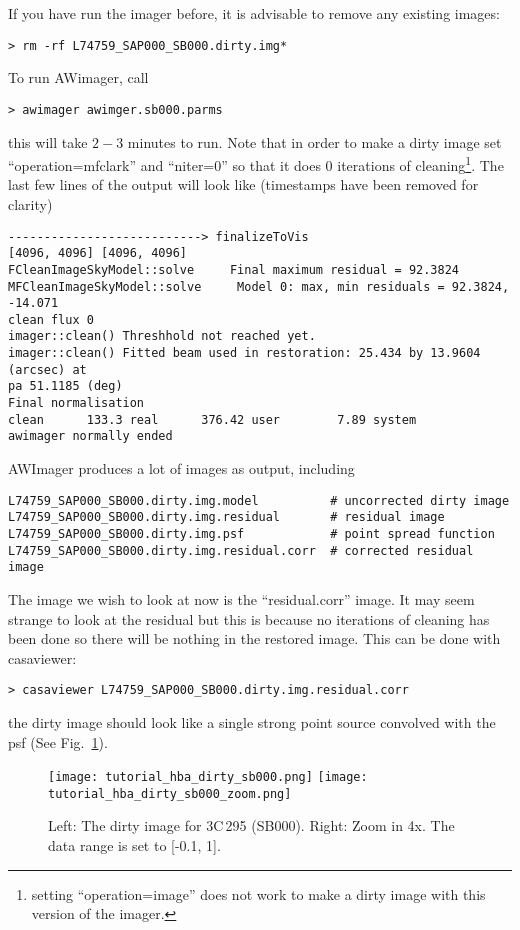 If you have run the imager before, it is advisable to remove any existing images:
\begin{verbatim}
> rm -rf L74759_SAP000_SB000.dirty.img*
\end{verbatim}
To run AWimager, call
\begin{verbatim}
> awimager awimger.sb000.parms
\end{verbatim}
this will take $2-3$ minutes to run. Note that in order to make a dirty image set ``operation=mfclark'' and ``niter=0'' so that it does 0 iterations of cleaning\footnote{setting ``operation=image'' does not work to make a dirty image with this version of the imager.}. The last few lines of the output will look like (timestamps have been removed for clarity)
\begin{lstlisting}
---------------------------> finalizeToVis
[4096, 4096] [4096, 4096]
FCleanImageSkyModel::solve     Final maximum residual = 92.3824
MFCleanImageSkyModel::solve     Model 0: max, min residuals = 92.3824, -14.071 
clean flux 0
imager::clean() Threshhold not reached yet.
imager::clean() Fitted beam used in restoration: 25.434 by 13.9604 (arcsec) at 
pa 51.1185 (deg) 
Final normalisation
clean      133.3 real      376.42 user        7.89 system
awimager normally ended
\end{lstlisting}
AWImager produces a lot of images as output, including
\begin{verbatim}
L74759_SAP000_SB000.dirty.img.model          # uncorrected dirty image
L74759_SAP000_SB000.dirty.img.residual       # residual image
L74759_SAP000_SB000.dirty.img.psf            # point spread function
L74759_SAP000_SB000.dirty.img.residual.corr  # corrected residual image
\end{verbatim} 
The image we wish to look at now is the ``residual.corr'' image. It may seem strange to look at the residual but this is because no iterations of cleaning has been done so there will be nothing in the restored image. This can be done with casaviewer:
\begin{verbatim}
> casaviewer L74759_SAP000_SB000.dirty.img.residual.corr
\end{verbatim}
the dirty image should look like a single strong point source convolved with the psf (See Fig.~\ref{fig:tutorial_hba_dirty_images}).

\begin{figure}[htp]
 \centering
\texttt{[image: tutorial\_hba\_dirty\_sb000.png]}
\texttt{[image: tutorial\_hba\_dirty\_sb000\_zoom.png]}
\caption{Left: The dirty image for 3C\,295 (SB000). Right: Zoom in 4x. The data range is set to [-0.1, 1].}
\label{fig:tutorial_hba_dirty_images}
\end{figure}

